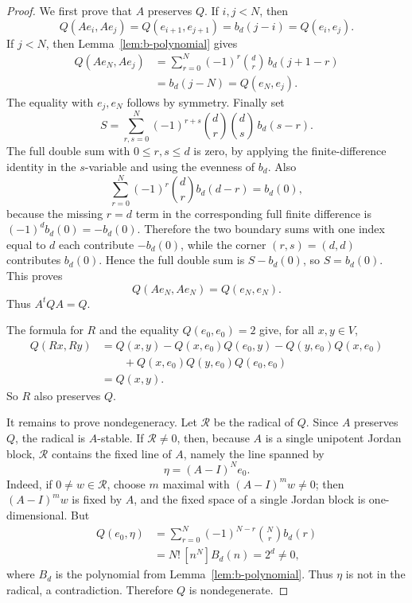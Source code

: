 \documentclass[a4paper,11pt]{amsart}
\theoremstyle{remark}
\numberwithin{equation}{section}
\begin{document}
\begin{proof}
We first prove that \(A\) preserves \(Q\).  If \(i,j<N\), then
\[
        Q(Ae_i,Ae_j)=Q(e_{i+1},e_{j+1})=b_d(j-i)=Q(e_i,e_j).
\]
If \(j<N\), then Lemma~\ref{lem:b-polynomial} gives
\[
\begin{aligned}
        Q(Ae_N,Ae_j)
        &=
        \sum_{r=0}^{N}(-1)^r\binom dr\, b_d(j+1-r)       \\
        &=
        b_d(j-N)
        =
        Q(e_N,e_j).
\end{aligned}
\]
The equality with \(e_j,e_N\) follows by symmetry.  Finally set
\[
        S=
        \sum_{r,s=0}^{N}
        (-1)^{r+s}\binom dr\binom ds\,b_d(s-r).
\]
The full double sum with \(0\le r,s\le d\) is zero, by applying the finite-difference identity in the \(s\)-variable and using the evenness of \(b_d\).  Also
\[
        \sum_{r=0}^{N}(-1)^r\binom dr b_d(d-r)=b_d(0),
\]
because the missing \(r=d\) term in the corresponding full finite difference is \((-1)^d b_d(0)=-b_d(0)\).  Therefore the two boundary sums with one index equal to \(d\) each contribute \(-b_d(0)\), while the corner \((r,s)=(d,d)\) contributes \(b_d(0)\).  Hence the full double sum is \(S-b_d(0)\), so \(S=b_d(0)\).  This proves
\[
        Q(Ae_N,Ae_N)=Q(e_N,e_N).
\]
Thus \(A^tQA=Q\).

The formula for \(R\) and the equality \(Q(e_0,e_0)=2\) give, for all \(x,y\in V\),
\[
\begin{aligned}
        Q(Rx,Ry)
        &=Q(x,y)-Q(x,e_0)Q(e_0,y)-Q(y,e_0)Q(x,e_0)  \\
        &\qquad +Q(x,e_0)Q(y,e_0)Q(e_0,e_0)          \\
        &=Q(x,y).
\end{aligned}
\]
So \(R\) also preserves \(Q\).

It remains to prove nondegeneracy.  Let \(\mathcal R\) be the radical of \(Q\).  Since \(A\) preserves \(Q\), the radical is \(A\)-stable.  If \(\mathcal R\ne0\), then, because \(A\) is a single unipotent Jordan block, \(\mathcal R\) contains the fixed line of \(A\), namely the line spanned by
\[
        \eta=(A-I)^N e_0.
\]
Indeed, if \(0\ne w\in\mathcal R\), choose \(m\) maximal with \((A-I)^mw\ne0\); then \((A-I)^mw\) is fixed by \(A\), and the fixed space of a single Jordan block is one-dimensional.
But
\[
\begin{aligned}
        Q(e_0,\eta)
        &=
        \sum_{r=0}^{N}(-1)^{N-r}\binom Nr b_d(r)      \\
        &=
        N!\,[n^N]B_d(n)
        =2^d\ne0,
\end{aligned}
\]
where \(B_d\) is the polynomial from Lemma~\ref{lem:b-polynomial}.  Thus \(\eta\) is not in the radical, a contradiction.  Therefore \(Q\) is nondegenerate.
\end{proof}
\end{document}
